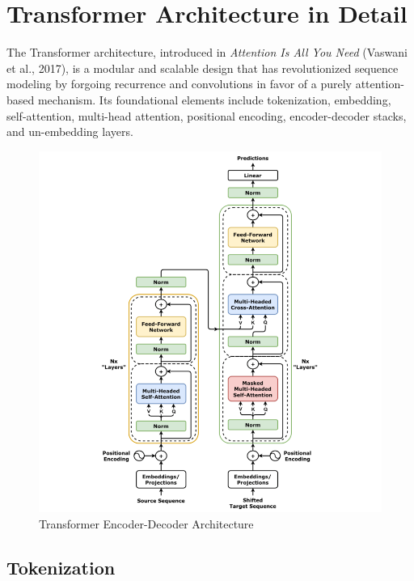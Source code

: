 \newpage

\section{Transformer Architecture in Detail}

The Transformer architecture, introduced in \textit{Attention Is All You Need} (Vaswani et al., 2017), is a modular and scalable design that has revolutionized sequence modeling by forgoing recurrence and convolutions in favor of a purely attention-based mechanism. Its foundational elements include tokenization, embedding, self-attention, multi-head attention, positional encoding, encoder-decoder stacks, and un-embedding layers.

\begin{figure}[H]
    \centering
    \includegraphics[width=\textwidth]{img/chap03/Transformer_architecture.png} %
    \caption{Transformer Encoder-Decoder Architecture}
    \label{fig:transformer_architecture}
\end{figure}

\subsection{Tokenization}

